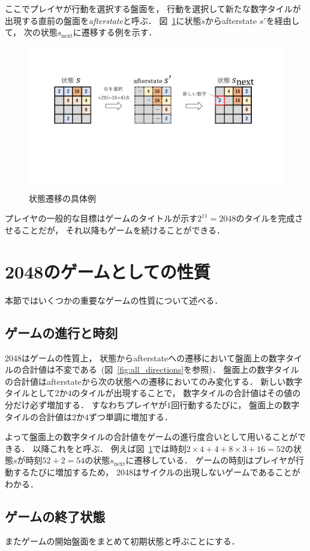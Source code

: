ここでプレイヤが行動を選択する盤面を， 行動を選択して新たな数字タイルが出現する直前の盤面を\textit{afterstate}と呼ぶ．
図~\ref{fig:transition}に状態$s$からafterstate $s'$を経由して， 次の状態$s_{\text{next}}$に遷移する例を示す．
\begin{figure}[t]
    \centering
    \includegraphics[width=\linewidth{}]{figures/transition_.pdf}
    \caption{状態遷移の具体例 \label{fig:transition}}
\end{figure}

プレイヤの一般的な目標はゲームのタイトルが示す$2^{11}=2048$のタイルを完成させることだが， それ以降もゲームを続けることができる．

\section{2048のゲームとしての性質}
\label{sec:property}
本節ではいくつかの重要なゲームの性質について述べる．

\subsection{ゲームの進行と時刻}
2048はゲームの性質上， 状態からafterstateへの遷移において盤面上の数字タイルの合計値は不変である~(図~\ref{fig:all_directions}を参照)．
盤面上の数字タイルの合計値はafterstateから次の状態への遷移においてのみ変化する．
新しい数字タイルとして$2$か$4$のタイルが出現することで， 数字タイルの合計値はその値の分だけ必ず増加する．
すなわちプレイヤが$1$回行動するたびに， 盤面上の数字タイルの合計値は$2$か$4$ずつ単調に増加する．

よって盤面上の数字タイルの合計値をゲームの進行度合いとして用いることができる．
以降これをと呼ぶ．
例えば図~\ref{fig:transition}では時刻$2\times4+4+8\times3+16=52$の状態$s$が時刻$52+2=54$の状態$s_{\text{next}}$に遷移している．
ゲームの時刻はプレイヤが行動するたびに増加するため， 2048はサイクルの出現しないゲームであることがわかる．

\subsection{ゲームの終了状態}

またゲームの開始盤面をまとめて初期状態と呼ぶことにする．